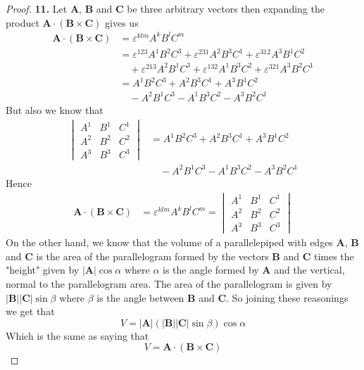 \documentclass[11pt]{article}
\theoremstyle{definition}
\begin{document}
\begin{proof}{\textbf{11.}}
    Let $\bm{A}$, $\bm{B}$ and $\bm{C}$ be three arbitrary vectors then
    expanding the product $\bm{A} \cdot (\bm{B} \times \bm{C})$ gives us
    \begin{align*}
        \bm{A} \cdot (\bm{B} \times \bm{C}) &= \varepsilon^{klm} A^kB^lC^m\\
        &= \varepsilon^{123} A^1B^2C^3 + \varepsilon^{231} A^2B^3C^1
        + \varepsilon^{312} A^3B^1C^2\\
        &\quad + \varepsilon^{213} A^2B^1C^3 + \varepsilon^{132} A^1B^3C^2
        + \varepsilon^{321} A^3B^2C^1\\
        &= A^1B^2C^3 + A^2B^3C^1 + A^3B^1C^2\\
        &\quad - A^2B^1C^3 - A^1B^3C^2 - A^3B^2C^1
    \end{align*}
    But also we know that
    \begin{align*}
        \begin{vmatrix}
            A^1 & B^1 & C^1\\
            A^2 & B^2 & C^2\\
            A^3 & B^3 & C^3
        \end{vmatrix}
        &= A^1B^2C^3 + A^2B^3C^1 + A^3B^1C^2\\
        &\quad - A^2B^1C^3 - A^1B^3C^2 - A^3B^2C^1
    \end{align*}
    Hence
    \begin{align*}
        \bm{A} \cdot (\bm{B} \times \bm{C}) &= \varepsilon^{klm} A^kB^lC^m
        =
        \begin{vmatrix}
            A^1 & B^1 & C^1\\
            A^2 & B^2 & C^2\\
            A^3 & B^3 & C^3
        \end{vmatrix}
    \end{align*}
    On the other hand, we know that the volume of a parallelepiped with edges
    $\bm{A}$, $\bm{B}$ and $\bm{C}$ is the area of the
    parallelogram formed by the vectors $\bm{B}$ and $\bm{C}$ times the
    "height" given by $|\bm{A}|\cos\alpha$ where $\alpha$ is the angle formed
    by $\bm{A}$ and the vertical, normal to the parallelogram area.
    The area of the parallelogram is given by $|\bm{B}| |\bm{C}|\sin\beta$
    where $\beta$ is the angle between $\bm{B}$ and $\bm{C}$.
    So joining these reasonings we get that
    $$V = |\bm{A}|(|\bm{B}||\bm{C}|\sin\beta)\cos\alpha$$
    Which is the same as saying that
    $$V = \bm{A}\cdot (\bm{B} \times \bm{C})$$
\end{proof}
\end{document}
